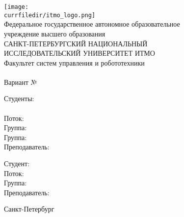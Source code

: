 \begin{titlepage}
    \begin{center}
        \ifdefined\logo
            \logo
        \else
            \texttt{[image: \\currfiledir/itmo\_logo.png]}
        \fi\\[10pt]
        Федеральное государственное автономное образовательное \\ учреждение высшего образования \\[6pt]
        САНКТ-ПЕТЕРБУРГСКИЙ НАЦИОНАЛЬНЫЙ \\ ИССЛЕДОВАТЕЛЬСКИЙ УНИВЕРСИТЕТ ИТМО \\[16pt]
        Факультет систем управления и робототехники \vfill
        {\large \worktype} \\[0.5em]
        {\large \textbf{\MakeUppercase{\workname}}}\\[0.5em]
        \ifdefined\varnum
            Вариант №\varnum
        \fi
    \end{center}\vfill
    \begin{flushright}
        \ifdefined\students
            \begin{minipage}{0.3\textwidth}
                Студенты:\\\students
                \ifdefined\studystream
                    \\[0.5em] Поток: \studystream
                    \ifdefined\groupnumber
                        \\ Группа: \groupnumber
                    \fi
                \else
                    \ifdefined\groupnumber
                        \\[0.5em] Группа: \groupnumber
                    \fi
                \fi \\[0.5em]
                Преподаватель: \teachername
            \end{minipage}
        \else
            Студент: \studentname
            \ifdefined\studystream
                \\ Поток: \studystream
            \fi
            \ifdefined\groupnumber
                \\ Группа: \groupnumber
            \fi \\[0.5em]
            Преподаватель: \teachername
        \fi
    \end{flushright}\vfill
    \begin{center}
        {\small Санкт-Петербург \\ \ifdefined\copyrightyear \copyrightyear \else \the\year \fi}
    \end{center}
\end{titlepage}
\setcounter{page}{2}
\ifshowTOC
    \tableofcontents\newpage
\fi
